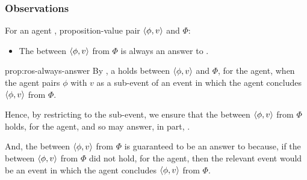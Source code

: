 \subsubsection{Observations}

\begin{note}
  \begin{proposition}
    \label{prop:ros-always-answer}
    For an agent \vAgent{}, proposition-value pair \(\langle \phi, v \rangle\) and \pool{} \(\Phi\):

    \begin{itemize}
    \item
      The \ros{} between \(\langle \phi, v \rangle\) from \(\Phi\) is always an answer to \qWhyV{}.
    \end{itemize}
    \vspace{-\baselineskip}
  \end{proposition}

  \begin{argument}{prop:ros-always-answer}
    By \supportI{}, a \ros{} holds between \(\langle \phi, v \rangle\) and \(\Phi\), for the agent, when the agent pairs \(\phi\) with \(v\) as a sub-event of an event in which the agent concludes \(\langle \phi, v \rangle\) from \(\Phi\).

    Hence, by restricting \qWhyV{} to the sub-event, we ensure that the \ros{} between \(\langle \phi, v \rangle\) from \(\Phi\) holds, for the agent, and so may answer, in part, \qWhyV{}.

    And, the \ros{} between \(\langle \phi, v \rangle\) from \(\Phi\) is guaranteed to be an answer to \qWhyV{} because, if the \ros{} between \(\langle \phi, v \rangle\) from \(\Phi\) did not hold, for the agent, then the relevant event would be an event in which the agent concludes \(\langle \phi, v \rangle\) from \(\Phi\).
  \end{argument}
\end{note}

